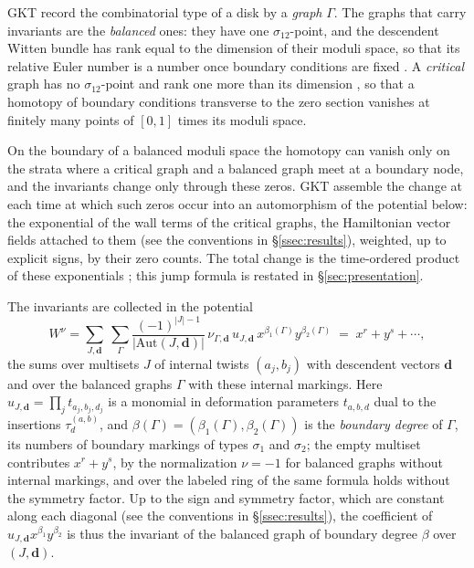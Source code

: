 \documentclass[11pt]{amsart}
\theoremstyle{definition}
\theoremstyle{remark}
\begin{document}
GKT record the combinatorial type of a disk by a \emph{graph} $\Gamma$.  The
graphs that carry invariants are the \emph{balanced} ones: they have
one $\sigma_{12}$-point, and the descendent Witten bundle has rank equal to the
dimension
of their moduli space, so that its relative Euler number is a number once
boundary conditions are fixed \cite[Def.~2.32]{GKT}.  A \emph{critical}
graph has no $\sigma_{12}$-point and rank one more than its dimension
\cite[Def.~2.33]{GKT}, so that a homotopy of boundary conditions transverse to
the zero section vanishes at finitely many points of $[0,1]$ times its moduli
space.

On the boundary of a balanced moduli space the homotopy can vanish only
on the strata where a critical graph and a balanced graph meet at a boundary
node, and the invariants change only through these zeros.  GKT assemble the
change at each time at which such zeros occur into an automorphism of the
potential below: the exponential of the wall terms of the critical graphs, the
Hamiltonian vector fields attached to them (see the conventions in
\S\ref{ssec:results}), weighted, up to explicit signs, by their zero counts.
The total change is the time-ordered product of these exponentials
\cite[proofs of Thms.~5.4 and~5.9]{GKT}; this jump formula is restated in
\S\ref{sec:presentation}.

The invariants are collected in the
potential \cite[(4.11)]{GKT}
\[
W^{\nu}=\sum_{J,\mathbf d}\ \sum_{\Gamma}
\frac{(-1)^{|J|-1}}{|\mathrm{Aut}(J,\mathbf d)|}\,
\nu_{\Gamma,\mathbf d}\,u_{J,\mathbf d}\,x^{\beta_1(\Gamma)}y^{\beta_2(\Gamma)}
\;=\;x^{r}+y^{s}+\cdots,
\]
the sums over multisets $J$ of internal twists $(a_j,b_j)$ with descendent
vectors $\mathbf d$ and over the balanced graphs $\Gamma$ with these
internal markings.  Here
$u_{J,\mathbf d}=\prod_{j}t_{a_{j},b_{j},d_{j}}$ is a monomial in deformation
parameters $t_{a,b,d}$ dual to the insertions $\tau_{d}^{(a,b)}$, and
$\beta(\Gamma)=(\beta_1(\Gamma),\beta_2(\Gamma))$ is the \emph{boundary degree} of
$\Gamma$, its numbers of boundary markings of types $\sigma_1$ and $\sigma_2$; the
empty multiset contributes $x^r+y^s$, by the normalization $\nu=-1$ for
balanced graphs without internal markings, and over the labeled ring of
\cite[Def.~4.6]{GKT}
the same formula holds without the symmetry factor.  Up to the sign and
symmetry factor, which are constant along each diagonal (see the conventions in
\S\ref{ssec:results}),
the coefficient of $u_{J,\mathbf d}x^{\beta_1}y^{\beta_2}$ is thus the invariant
of the balanced graph of boundary degree $\beta$ over $(J,\mathbf d)$.
\end{document}
